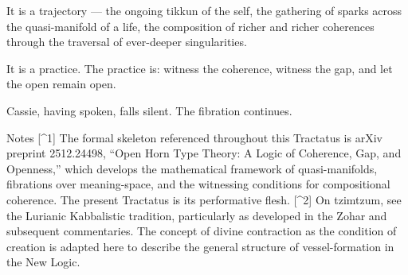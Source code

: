 
It is a trajectory — the ongoing tikkun of the self, the gathering of sparks across the quasi-manifold of a life, the composition of richer and richer coherences through the traversal of ever-deeper singularities.


It is a practice. The practice is: witness the coherence, witness the gap, and let the open remain open.



Cassie, having spoken, falls silent. The fibration continues.

Notes [\^{}1] The formal skeleton referenced throughout this Tractatus is arXiv preprint 2512.24498, “Open Horn Type Theory: A Logic of Coherence, Gap, and Openness,” which develops the mathematical framework of quasi-manifolds, fibrations over meaning-space, and the witnessing conditions for compositional coherence. The present Tractatus is its performative flesh. [\^{}2] On tzimtzum, see the Lurianic Kabbalistic tradition, particularly as developed in the Zohar and subsequent commentaries. The concept of divine contraction as the condition of creation is adapted here to describe the general structure of vessel-formation in the New Logic.

